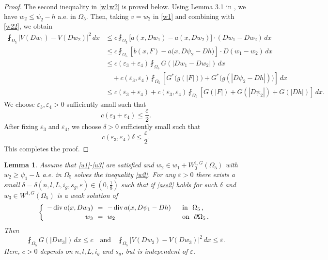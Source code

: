 \documentclass[10pt,a4paper]{article}
\newtheorem{lemma}[theorem]{Lemma}
\theoremstyle{definition}
\numberwithin{equation}{section}
\begin{document}
\begin{proof}
	 The second inequality in \eqref{w1w2} is proved below.
	 Using Lemma 3.1 in \cite{blo}, we have $w_2\leqslant \psi_2-h$ a.e. in $\Omega_5$. Then, taking $v=w_2$ in \eqref{w1}  and combining with \eqref{w22}, we obtain 
	 \begin{align*}
	 	\fint_{\Omega_5}
	 	\left|V(Dw_1)-V(Dw_2)\right|^2\,dx
	 	&\leq
	 	c\fint_{\Omega_5}
	 	\bigl[a(x,Dw_1)-a(x,Dw_2)\bigr]
	 	\cdot(Dw_1-Dw_2)\,dx
	 	\\
	 	&\leq
	 	c\fint_{\Omega_5}
	 	\left[
	 	b(x,F)-a\bigl(x,D\psi_2-Dh\bigr)
	 	\right]
	 	\cdot D(w_1-w_2)\,dx
	 	\\
	 	&\leq
	 	c(\varepsilon_3+\varepsilon_4)
	 	\fint_{\Omega_5}
	 	G(|Dw_1-Dw_2|)\,dx
	 	\\
	 	&\quad+
	 	c(\varepsilon_3,\varepsilon_4)
	 	\fint_{\Omega_5}
	 	\left[
	 	G^*\bigl(g(|F|)\bigr)
	 	+
	 	G^*\bigl(g(|D\psi_2-Dh|)\bigr)
	 	\right]\,dx
	 	\\
	 	&\leq
	 	c(\varepsilon_3+\varepsilon_4)+
	 	c(\varepsilon_3,\varepsilon_4)
	 	\fint_{\Omega_5}
	 	\left[
	 	G(|F|)
	 	+
	 	G(|D\psi_2|)
	 	+
	 	G(|Dh|)
	 	\right]\,dx.
	 \end{align*}
	 We choose $\varepsilon_3,\varepsilon_4>0$ sufficiently small such that
	 \[
	 c(\varepsilon_3+\varepsilon_4)\leq\frac{\varepsilon}{2}.
	 \]
	 After fixing $\varepsilon_3$ and $\varepsilon_4$, we choose $\delta>0$
	 sufficiently small such that
	 \[
	 c(\varepsilon_3,\varepsilon_4)\delta
	 \leq\frac{\varepsilon}{2}.
	 \]
	 This completes the proof.
	\end{proof}
	
		\begin{lemma}\label{w2w3l}
		Assume that \eqref{u1}-\eqref{u3} are satisfied and   $w_2 \in w_1+ W_0^{1,G}(\Omega_5)$ with $ w_2 \geqslant \psi_1-h$ a.e. in $\Omega_5$ solves  the inequality \eqref{w2}.  
		For any $\varepsilon > 0$ there exists a small $\delta=\delta(n,l,L,i_g,s_g,\varepsilon) \in (0,\frac{1}{8})$ such that if \eqref{ass2} holds for such $\delta$ and  $w_3 \in W^{1,G}(\Omega_5)$ is a weak solution of 
		\begin{equation}\label{w3}
			\left\{\begin{array}{r@{\ \ }c@{\ \ }ll}
					-\operatorname{div}a(x,Dw_3) &=&-\operatorname{div}a(x,D\psi_1-Dh) \ \ &\mbox{in}\ \   \Omega_5 \,,  \\[0.05cm]
				 w_3 &=&w_2 \ \ &\mbox{on}\ \ \partial \Omega_5 \,.
			\end{array}\right.
		\end{equation}
		Then
		\begin{equation}\label{w2w3}
			\fint_{\Omega_5} G(|Dw_3|)\,dx \leq c \quad \text{and} \quad \fint_{\Omega_5} |V(Dw_2)-V(Dw_3)|^2\,dx \leq \varepsilon.  
		\end{equation}
		Here, $c > 0$ depends on $n,l,L,i_g$ and $s_g$, but is independent of $\varepsilon$.
	\end{lemma}
	
\end{document}
